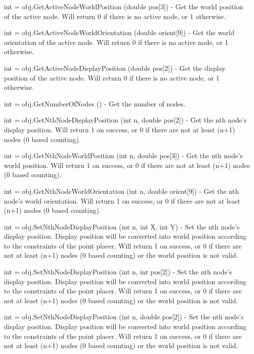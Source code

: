 \begin{DoxyItemize}
\item {\ttfamily int = obj.\-Get\-Active\-Node\-World\-Position (double pos\mbox{[}3\mbox{]})} -\/ Get the world position of the active node. Will return 0 if there is no active node, or 1 otherwise.  
\item {\ttfamily int = obj.\-Get\-Active\-Node\-World\-Orientation (double orient\mbox{[}9\mbox{]})} -\/ Get the world orientation of the active node. Will return 0 if there is no active node, or 1 otherwise.  
\item {\ttfamily int = obj.\-Get\-Active\-Node\-Display\-Position (double pos\mbox{[}2\mbox{]})} -\/ Get the display position of the active node. Will return 0 if there is no active node, or 1 otherwise.  
\item {\ttfamily int = obj.\-Get\-Number\-Of\-Nodes ()} -\/ Get the number of nodes.  
\item {\ttfamily int = obj.\-Get\-Nth\-Node\-Display\-Position (int n, double pos\mbox{[}2\mbox{]})} -\/ Get the nth node's display position. Will return 1 on success, or 0 if there are not at least (n+1) nodes (0 based counting).  
\item {\ttfamily int = obj.\-Get\-Nth\-Node\-World\-Position (int n, double pos\mbox{[}3\mbox{]})} -\/ Get the nth node's world position. Will return 1 on success, or 0 if there are not at least (n+1) nodes (0 based counting).  
\item {\ttfamily int = obj.\-Get\-Nth\-Node\-World\-Orientation (int n, double orient\mbox{[}9\mbox{]})} -\/ Get the nth node's world orientation. Will return 1 on success, or 0 if there are not at least (n+1) nodes (0 based counting).  
\item {\ttfamily int = obj.\-Set\-Nth\-Node\-Display\-Position (int n, int X, int Y)} -\/ Set the nth node's display position. Display position will be converted into world position according to the constraints of the point placer. Will return 1 on success, or 0 if there are not at least (n+1) nodes (0 based counting) or the world position is not valid.  
\item {\ttfamily int = obj.\-Set\-Nth\-Node\-Display\-Position (int n, int pos\mbox{[}2\mbox{]})} -\/ Set the nth node's display position. Display position will be converted into world position according to the constraints of the point placer. Will return 1 on success, or 0 if there are not at least (n+1) nodes (0 based counting) or the world position is not valid.  
\item {\ttfamily int = obj.\-Set\-Nth\-Node\-Display\-Position (int n, double pos\mbox{[}2\mbox{]})} -\/ Set the nth node's display position. Display position will be converted into world position according to the constraints of the point placer. Will return 1 on success, or 0 if there are not at least (n+1) nodes (0 based counting) or the world position is not valid.  

\end{DoxyItemize}
